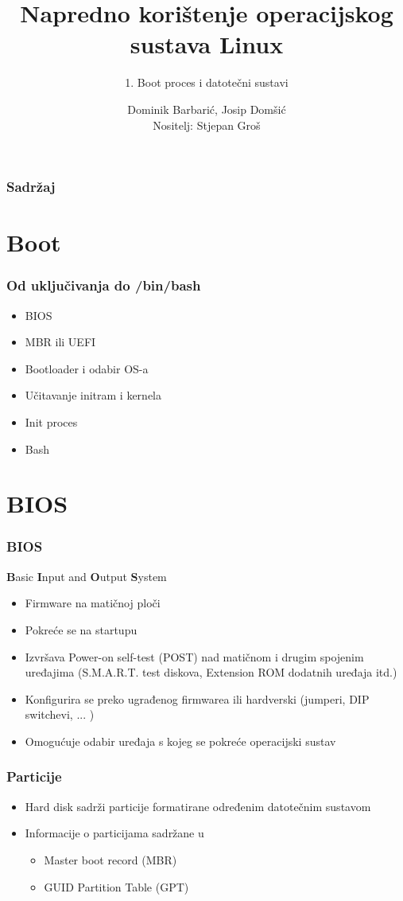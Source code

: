 \documentclass[t]{beamer}
\date{\todayiso}
\title[NKOSL]{Napredno korištenje operacijskog sustava Linux}
\author[Dominik Barbarić, Josip Domšić]{Dominik Barbarić, Josip Domšić\\{\small Nositelj: Stjepan Groš}}
\subtitle{1. Boot proces i datotečni sustavi}
\institute[FER]{Sveučilište u Zagrebu\\Fakultet elektrotehnike i računarstva}
\begin{document}
{
	\begin{frame}
		\maketitle
	\end{frame}
}

\begin{frame}
	\frametitle{Sadržaj}
	\tableofcontents
\end{frame}

\section{Boot}
\begin{frame}
    \frametitle{Od uključivanja do /bin/bash}
    \begin{itemize}
        \item BIOS 
        \item MBR ili UEFI
        \item Bootloader i odabir OS-a
        \item Učitavanje initram i kernela
        \item Init proces 
        \item Bash
    \end{itemize}
\end{frame}


\section{BIOS}
\begin{frame}
	\frametitle{BIOS}
	\textbf{B}asic \textbf{I}nput and \textbf{O}utput \textbf{S}ystem
	\begin{itemize}
		\item Firmware na matičnoj ploči
		\item Pokreće se na startupu
		\item Izvršava Power-on self-test (POST) nad matičnom i drugim spojenim uređajima (S.M.A.R.T. test diskova, Extension ROM dodatnih uređaja itd.)
		\item Konfigurira se preko ugrađenog firmwarea ili hardverski (jumperi, DIP switchevi, ... )
		\item Omogućuje odabir uređaja s kojeg se pokreće operacijski sustav
	\end{itemize}
\end{frame}

\begin{frame}
	\frametitle{Particije}
	\begin{itemize}
		\item Hard disk sadrži particije formatirane određenim datotečnim sustavom
		\item Informacije o particijama sadržane u
		\begin{itemize}
			\item Master boot record (MBR)
			\item GUID Partition Table (GPT)
		\end{itemize}
	\end{itemize}
\end{frame}	
\end{document}

